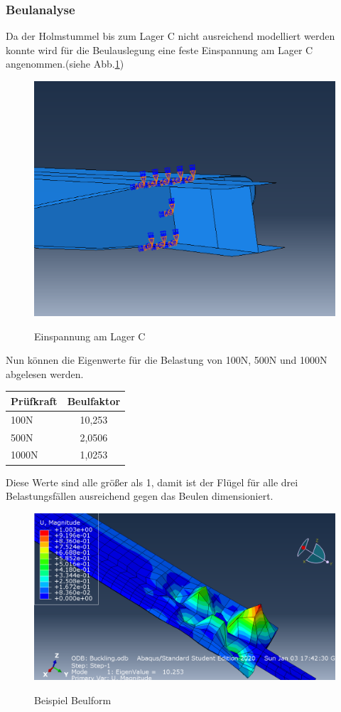 \subsubsection{Beulanalyse}
Da der Holmstummel bis zum Lager C nicht ausreichend modelliert werden konnte wird für die Beulauslegung eine feste Einspannung am Lager C angenommen.(siehe Abb.\ref{BEinspannung})
\begin{figure}[h]
 \centering
 \includegraphics[scale=0.4]{Bilder/Beuleinspannung}
 \label{BEinspannung}
 \caption{Einspannung am Lager C}
\end{figure}
Nun können die Eigenwerte für die Belastung von 100N, 500N und 1000N abgelesen werden.
\begin{center}
\begin{tabular}[h]{l|c}
Prüfkraft&Beulfaktor\\
\hline
100N&10,253\\
500N&2,0506\\
1000N&1,0253\\
\end{tabular}
\end{center}

Diese Werte sind alle größer als 1, damit ist der Flügel für alle drei Belastungsfällen ausreichend gegen das Beulen dimensioniert.
\begin{figure}[h]
 \centering
 \includegraphics[scale=0.4]{Bilder/Beulen100N}
 \label{Beulform}
 \caption{Beispiel Beulform}
\end{figure}
\newpage

 

  
